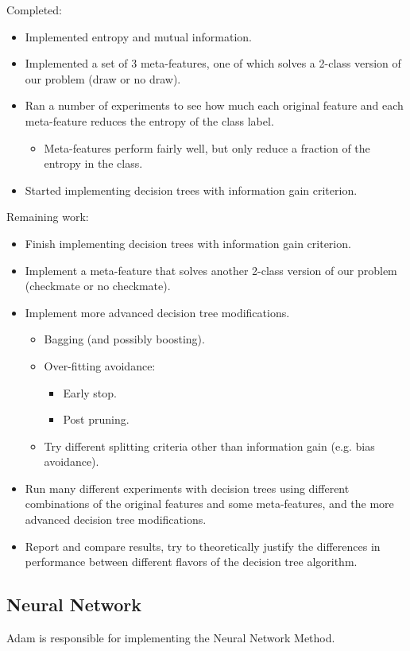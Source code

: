 \documentclass[10pt,fleqn]{article}%
\begin{document}
Completed:
\begin{itemize}
	\item Implemented entropy and mutual information.
  \item Implemented a set of 3 meta-features, one of which solves a 2-class
     version of our problem (draw or no draw).
  \item Ran a number of experiments to see how much each original feature
     and each meta-feature reduces the entropy of the class label.  
	\begin{itemize}
			\item Meta-features perform fairly well, but only reduce a fraction
         of the entropy in the class.
	\end{itemize}
  \item Started implementing decision trees with information gain criterion.
\end{itemize}
\pagebreak
Remaining work:
\begin{itemize}
	\item Finish implementing decision trees with information gain criterion.
  \item Implement a meta-feature that solves another 2-class version of our
     problem (checkmate or no checkmate).
  \item Implement more advanced decision tree modifications.
	\begin{itemize}
			\item Bagging (and possibly boosting).
      \item Over-fitting avoidance:  
			\begin{itemize}
					\item Early stop.
  				\item Post pruning.
			\end{itemize}
      \item Try different splitting criteria other than information gain (e.g. bias avoidance).
	\end{itemize}
  \item Run many different experiments with decision trees using different
     combinations of the original features and some meta-features, and
     the more advanced decision tree modifications.
  \item Report and compare results, try to theoretically justify the
         differences in performance between different flavors of the
         decision tree algorithm.
\end{itemize}
%    
\subsection{Neural Network}
\label{subsec:Adam}
Adam is responsible for implementing the Neural Network Method.
\end{document}
